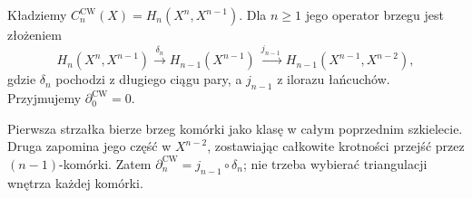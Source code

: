 \begin{definicja}
\label{def:kompleks-komorkowy}
Kładziemy
$C_n^{\mathrm{CW}}(X)=H_n(X^n,X^{n-1})$.
Dla $n\geq1$ jego operator brzegu
jest złożeniem
\begin{equation}\label{eq:cellular-boundary}
 H_n(X^n,X^{n-1})
 \xrightarrow{\ \delta_n\ }
 H_{n-1}(X^{n-1})
 \xrightarrow{\ j_{n-1}\ }
 H_{n-1}(X^{n-1},X^{n-2}),
\end{equation}
gdzie $\delta_n$ pochodzi z
długiego ciągu pary, a
$j_{n-1}$ z ilorazu łańcuchów.
Przyjmujemy $\partial_0^{\mathrm{CW}}=0$.
\end{definicja}

Pierwsza strzałka bierze brzeg komórki jako klasę w całym
poprzednim szkielecie. Druga zapomina jego część w $X^{n-2}$,
zostawiając całkowite krotności przejść przez $(n-1)$-komórki.
Zatem $\partial_n^{\mathrm{CW}}=j_{n-1}\circ\delta_n$;
nie trzeba wybierać triangulacji wnętrza każdej komórki.

